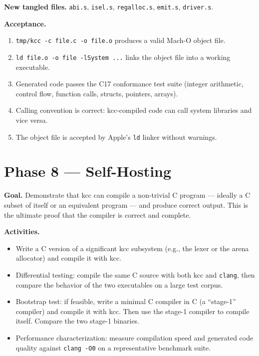\documentclass[11pt,a4paper,twoside,openright,DIV=15]{scrbook}
\theoremstyle{definition}
\theoremstyle{plain}
\theoremstyle{remark}
\newcommand{\kcc}{\textsf{kcc}}
\begin{document}
\textbf{New tangled files.}
\texttt{abi.s}, \texttt{isel.s}, \texttt{regalloc.s},
\texttt{emit.s}, \texttt{driver.s}.

\textbf{Acceptance.}
\begin{enumerate}
\item \texttt{tmp/kcc -c file.c -o file.o} produces a valid
      Mach-O object file.
\item \texttt{ld file.o -o file -lSystem ...} links the object
      file into a working executable.
\item Generated code passes the C17 conformance test suite
      (integer arithmetic, control flow, function calls,
      structs, pointers, arrays).
\item Calling convention is correct: \kcc{}-compiled code can
      call system libraries and vice versa.
\item The object file is accepted by Apple's \texttt{ld} linker
      without warnings.
\end{enumerate}

\section{Phase 8 --- Self-Hosting}
\label{sec:phase8}

\textbf{Goal.}  Demonstrate that \kcc{} can compile a
non-trivial C program --- ideally a C subset of itself or an
equivalent program --- and produce correct output.  This is the
ultimate proof that the compiler is correct and complete.

\textbf{Activities.}
\begin{itemize}
\item Write a C version of a significant \kcc{} subsystem
      (e.g., the lexer or the arena allocator) and compile it
      with \kcc{}.
\item Differential testing: compile the same C source with both
      \kcc{} and \texttt{clang}, then compare the behavior of
      the two executables on a large test corpus.
\item Bootstrap test: if feasible, write a minimal C compiler in
      C (a ``stage-1'' compiler) and compile it with \kcc{}.
      Then use the stage-1 compiler to compile itself.  Compare
      the two stage-1 binaries.
\item Performance characterization: measure compilation speed
      and generated code quality against \texttt{clang -O0} on
      a representative benchmark suite.
\end{itemize}
\end{document}
